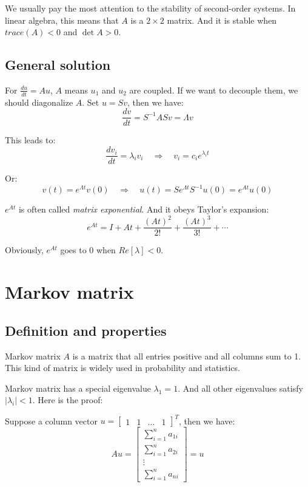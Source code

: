 \documentclass[10pt,a4paper,oneside,numbers=noenddot]{scrbook}
\theoremstyle{ctplain}
\theoremstyle{ctresult}
\begin{document}
We usually pay the most attention to the stability of second-order systems. In linear
algebra, this means that $A$ is a $2 \times 2$ matrix. And it is stable when $trace(A) < 0$
and $\det A > 0$.

\subsection{General solution}

For $\frac{du}{dt} = Au$, $A$ means $u_1$ and $u_2$ are coupled. If we want to
decouple them, we should diagonalize $A$. Set $u = Sv$, then we have:
\[
  \frac{dv}{dt} = S^{-1}ASv = \Lambda v
\]

This leads to:
\[
  \frac{dv_i}{dt} = \lambda_i v_i \quad \Rightarrow \quad v_i = c_i e^{\lambda_i t}
\]

Or:
\[
  v(t) = e^{\Lambda t} v(0) \quad \Rightarrow \quad u(t) = Se^{\Lambda t}S^{-1}u(0)
  = e^{At}u(0)
\]

$e^{At}$ is often called \emph{matrix exponential}. And it obeys Taylor's expansion:
\[
  e^{At} = I + At + \frac{(At)^2}{2!} + \frac{(At)^3}{3!} + \cdots
\]

Obviously, $e^{At}$ goes to 0 when $Re[\lambda] < 0$.

\section{Markov matrix}
\subsection{Definition and properties}

Markov matrix $A$ is a matrix that all entries positive and all columns sum to 1. This
kind of matrix is widely used in probability and statistics.

Markov matrix has a special eigenvalue $\lambda_1 = 1$. And all other eigenvalues satisfy
$|\lambda_i| < 1$. Here is the proof:

Suppose a column vector $u = \begin{bmatrix}1 & 1 & \ldots & 1\end{bmatrix}^T$, then we
have:
\[
  Au = \begin{bmatrix}
  \sum_{i=1}^{n} a_{1i} \\
  \sum_{i=1}^{n} a_{2i} \\
  \vdots \\
  \sum_{i=1}^{n} a_{ni}
  \end{bmatrix}
  = u
\]
\end{document}

